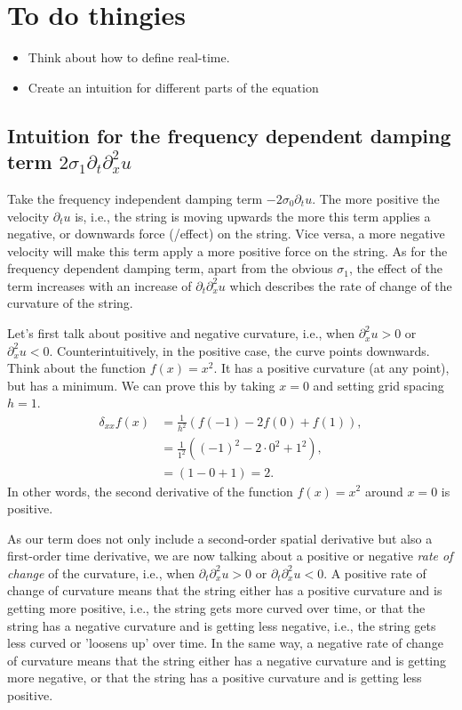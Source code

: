 \section{To do thingies}\label{sec:ch2label}
\begin{itemize}
  \item Think about how to define real-time.
  \item Create an intuition for different parts of the equation
\end{itemize}

\subsection{Intuition for the frequency dependent damping term $2\sigma_1\partial_t\partial_x^2u$}
Take the frequency independent damping term $-2\sigma_0\partial_tu$. The more positive the velocity $\partial_tu$ is, i.e., the string is moving upwards the more this term applies a negative, or downwards force (/effect) on the string. Vice versa, a more negative velocity will make this term apply a more positive force on the string. As for the frequency dependent damping term, apart from the obvious $\sigma_1$, the effect of the term increases with an increase of $\partial_t\partial_x^2u$ which describes the rate of change of the curvature of the string.

Let's first talk about positive and negative curvature, i.e., when $\partial_x^2u > 0$ or $\partial_x^2u < 0$. Counterintuitively, in the positive case, the curve points downwards. Think about the function $f(x) = x^2$. It has a positive curvature (at any point), but has a minimum. We can prove this by taking $x=0$ and setting grid spacing $h=1$.
\begin{equation}
  \begin{aligned}
  \delta_{xx}f(x) &= \frac{1}{h^2} \left(f(-1)-2f(0)+f(1)\right), \\
  &= \frac{1}{1^2} \left((-1)^2-2\cdot0^2+1^2\right),\\
  &= \left(1-0+1\right) = 2.
  \end{aligned}
\end{equation}
In other words, the second derivative of the function $f(x)=x^2$ around $x=0$ is positive.

As our term does not only include a second-order spatial derivative but also a first-order time derivative, we are now talking about a positive or negative \textit{rate of change} of the curvature, i.e., when $\partial_t\partial_x^2u>0$ or $\partial_t\partial_x^2u<0$. A positive rate of change of curvature means that the string either has a positive curvature and is getting more positive, i.e., the string gets more curved over time, or that the string has a negative curvature and is getting less negative, i.e., the string gets less curved or 'loosens up' over time.  In the same way, a negative rate of change of curvature means that the string either has a negative curvature and is getting more negative, or that the string has a positive curvature and is getting less positive. 

